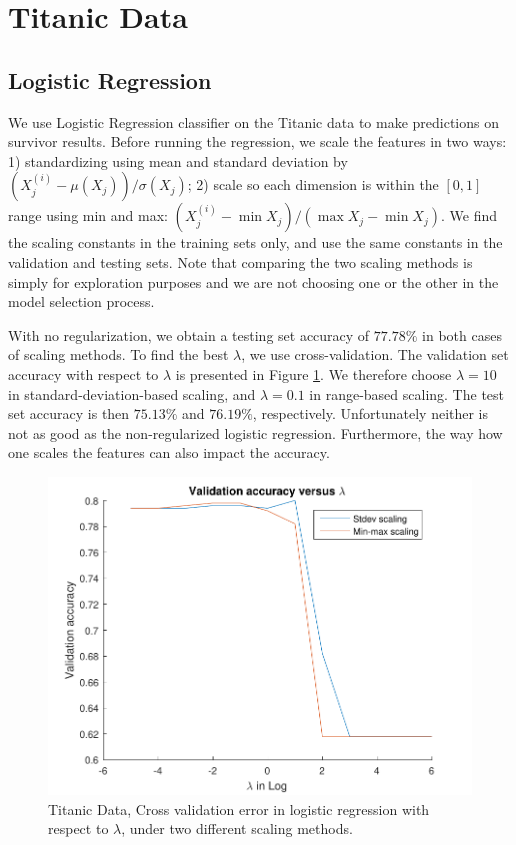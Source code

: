 
\section{Titanic Data}\label{sec:titanic}

\subsection{Logistic Regression}
We use Logistic Regression classifier on the Titanic data to make predictions on survivor results. Before running the regression, we scale the features in two ways: 1) standardizing using mean and standard deviation by $(X_{j}^{(i)} - \mu(X_{j}))/\sigma(X_{j})$; 2) scale so each dimension is within the $[0, 1]$ range using min and max: $(X_{j}^{(i)} - \min{X_j})/(\max{X_j} - \min{X_j})$. We find the scaling constants in the training sets only, and use the same constants in the validation and testing sets. Note that comparing the two scaling methods is simply for exploration purposes and we are not choosing one or the other in the model selection process.

With no regularization, we obtain a testing set accuracy of $77.78\%$ in both cases of scaling methods. To find the best $\lambda$, we use cross-validation. The validation set accuracy with respect to $\lambda$ is presented in Figure \ref{fig:3_LR_cv}. We therefore choose $\lambda = 10$ in standard-deviation-based scaling, and $\lambda = 0.1$ in range-based scaling. The test set accuracy is then $75.13\%$ and $76.19\%$, respectively. Unfortunately neither is not as good as the non-regularized logistic regression. Furthermore, the way how one scales the features can also impact the accuracy.

\begin{figure}[hb]
\centering
	\includegraphics[scale=0.4]{hw2_3_cv.pdf}
	\caption{Titanic Data, Cross validation error in logistic regression with respect to $\lambda$, under two different scaling methods.}\label{fig:3_LR_cv}
\end{figure}

